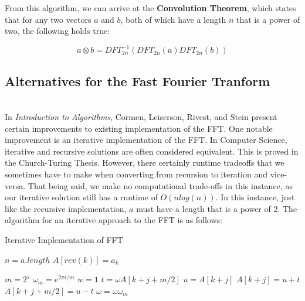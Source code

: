 \documentclass{amsproc}
\begin{document}
From this algorithm, we can arrive at the \textbf{Convolution Theorem}, which states that for any two vectors $a$ and $b$, both of which have a length $n$ that is a power of two, the following holds true:

$$
a \otimes b = DFT_{2n}^{-1}(DFT_{2n}(a) DFT_{2n}(b))
$$

\subsection{Alternatives for the Fast Fourier Tranform}

\mbox{}	 \\
\indent In \textit{Introduction to Algorithms}, Cormen, Leiserson, Rivest, and Stein present certain improvements to existing implementation of the FFT. One notable improvement is an iterative implementation of the FFT. In Computer Science, iterative and recursive solutions are often considered equivalent. This is proved in the Church-Turing Thesis. However, there certainly runtime tradeoffs that we sometimes have to make when converting from recursion to iteration and vice-versa. That being said, we make no computational trade-offs in this instance, as our iterative solution still has a runtime of $O(nlog(n))$. In this instance, just like the recursive implementation, $a$ must have a length that is a power of 2. The algorithm for an iterative approach to the FFT is as follows:

\begin{algorithm}
\caption{Iterative Implementation of FFT}\label{it-fft}
\begin{algorithmic}[1]

\State $n = a.length$
	\State $A[rev(k)] = a_k$ 
\EndFor

\EndProcedure


\State {}
	\State $m = 2^s$
	\State $\omega_m = e^{2 \pi i / m}$
		\State $w = 1$
			\State $t = \omega A[k + j + m/2]$
			\State $u = A[k+j]$
			\State $A[k+j] = u + t$
			\State $A[k+j+m/2] = u - t$
			\State $\omega = \omega \omega_m$
		\EndFor
	\EndFor
\EndFor

\EndProcedure

\end{algorithmic}
\end{algorithm}
\end{document}
